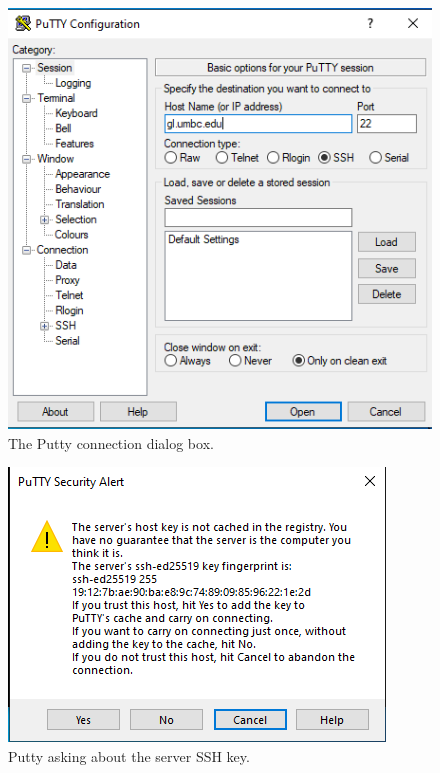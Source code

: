 \documentclass[letter,11pt]{article}
\begin{document}
\begin{figure}
\centering
\includegraphics[scale=0.6]{Images/putty_connect_1.png}
\caption{The Putty connection dialog box.}
\label{fig:puttyconnection}
\end{figure}

\begin{figure}
\centering
\includegraphics[scale=0.7]{Images/putty_connect_2_first_time.png}
\caption{Putty asking about the server SSH key.}
\label{fig:puttyserverkey}
\end{figure}
\end{document}
